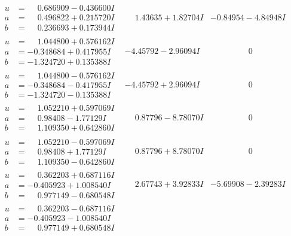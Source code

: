 \documentclass[1p]{elsarticle_modified}
\theoremstyle{definition}
\begin{document}
$$\begin{array}{c|c|c}
\begin{aligned}
u &= \phantom{-}0.686909 - 0.436600 I \\
a &= \phantom{-}0.496822 + 0.215720 I \\
b &= \phantom{-}0.236693 + 0.173944 I\end{aligned}
 & \phantom{-}1.43635 + 1.82704 I & -0.84954 - 4.84948 I \\ \hline\begin{aligned}
u &= \phantom{-}1.044800 + 0.576162 I \\
a &= -0.348684 + 0.417955 I \\
b &= -1.324720 + 0.135388 I\end{aligned}
 & -4.45792 - 2.96094 I & \phantom{-0.000000 } 0 \\ \hline\begin{aligned}
u &= \phantom{-}1.044800 - 0.576162 I \\
a &= -0.348684 - 0.417955 I \\
b &= -1.324720 - 0.135388 I\end{aligned}
 & -4.45792 + 2.96094 I & \phantom{-0.000000 } 0 \\ \hline\begin{aligned}
u &= \phantom{-}1.052210 + 0.597069 I \\
a &= \phantom{-}0.98408 - 1.77129 I \\
b &= \phantom{-}1.109350 + 0.642860 I\end{aligned}
 & \phantom{-}0.87796 - 8.78070 I & \phantom{-0.000000 } 0 \\ \hline\begin{aligned}
u &= \phantom{-}1.052210 - 0.597069 I \\
a &= \phantom{-}0.98408 + 1.77129 I \\
b &= \phantom{-}1.109350 - 0.642860 I\end{aligned}
 & \phantom{-}0.87796 + 8.78070 I & \phantom{-0.000000 } 0 \\ \hline\begin{aligned}
u &= \phantom{-}0.362203 + 0.687116 I \\
a &= -0.405923 + 1.008540 I \\
b &= \phantom{-}0.977149 - 0.680548 I\end{aligned}
 & \phantom{-}2.67743 + 3.92833 I & -5.69908 - 2.39283 I \\ \hline\begin{aligned}
u &= \phantom{-}0.362203 - 0.687116 I \\
a &= -0.405923 - 1.008540 I \\
b &= \phantom{-}0.977149 + 0.680548 I\end{aligned}

\end{array}$$
\end{document}
